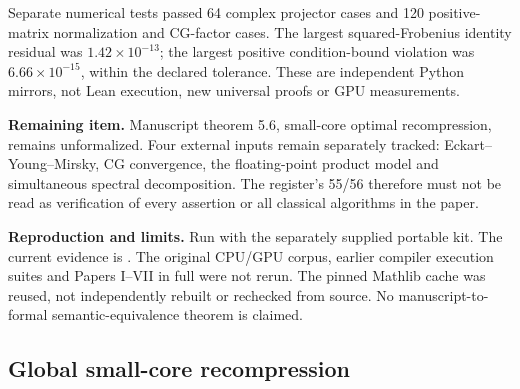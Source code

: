 Separate numerical tests passed 64 complex projector cases and 120 positive-matrix normalization and CG-factor cases. The largest squared-Frobenius identity residual was $1.42\times10^{-13}$; the largest positive condition-bound violation was $6.66\times10^{-15}$, within the declared tolerance. These are independent Python mirrors, not Lean execution, new universal proofs or GPU measurements.

\textbf{Remaining item.} Manuscript theorem 5.6, small-core optimal recompression, remains unformalized. Four external inputs remain separately tracked: Eckart--Young--Mirsky, CG convergence, the floating-point product model and simultaneous spectral decomposition. The register's 55/56 therefore must not be read as verification of every assertion or all classical algorithms in the paper.

\textbf{Reproduction and limits.} Run  with the separately supplied portable kit. The current evidence is . The original CPU/GPU corpus, earlier compiler execution suites and Papers I--VII in full were not rerun. The pinned Mathlib cache was reused, not independently rebuilt or rechecked from source. No manuscript-to-formal semantic-equivalence theorem is claimed.


\subsection{Global small-core recompression}\label{sec:history-6}


